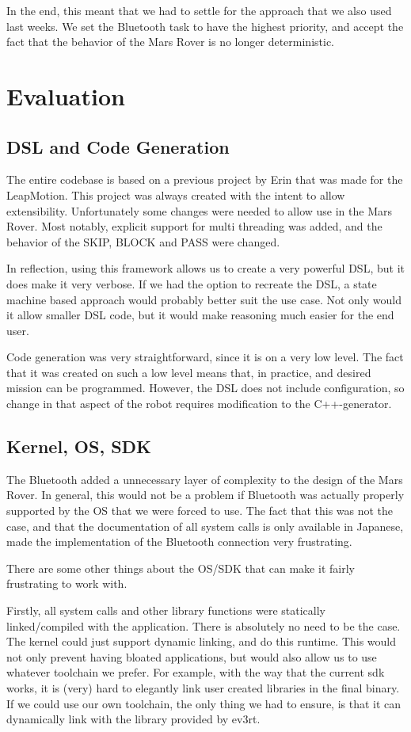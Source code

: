 \documentclass{scrartcl}
\begin{document}
In the end, this meant that we had to settle for the approach that we also used last weeks.
We set the Bluetooth task to have the highest priority, and accept the fact that the behavior of the Mars Rover is no longer deterministic.

\section{Evaluation}
\subsection{DSL and Code Generation}
The entire codebase is based on a previous project by Erin that was made for the LeapMotion.
This project was always created with the intent to allow extensibility.
Unfortunately some changes were needed to allow use in the Mars Rover.
Most notably, explicit support for multi threading was added, and the behavior of the SKIP, BLOCK and PASS were changed.

In reflection, using this framework allows us to create a very powerful DSL, but it does make it very verbose.
If we had the option to recreate the DSL, a state machine based approach would probably better suit the use case.
Not only would it allow smaller DSL code, but it would make reasoning much easier for the end user.

Code generation was very straightforward, since it is on a very low level.
The fact that it was created on such a low level means that, in practice, and desired mission can be programmed.
However, the DSL does not include configuration, so change in that aspect of the robot requires modification to the C++-generator.

\subsection{Kernel, OS, SDK}
The Bluetooth added a unnecessary layer of complexity to the design of the Mars Rover.
In general, this would not be a problem if Bluetooth was actually properly supported by the OS that we were forced to use.
The fact that this was not the case, and that the documentation of all system calls is only available in Japanese, made the implementation of the Bluetooth connection very frustrating.

There are some other things about the OS/SDK that can make it fairly frustrating to work with.

Firstly, all system calls and other library functions were statically linked/compiled with the application.
There is absolutely no need to be the case.
The kernel could just support dynamic linking, and do this runtime.
This would not only prevent having bloated applications, but would also allow us to use whatever toolchain we prefer.
For example, with the way that the current sdk works, it is (very) hard to elegantly link user created libraries in the final binary.
If we could use our own toolchain, the only thing we had to ensure, is that it can dynamically link with the library provided by ev3rt.
\end{document}
